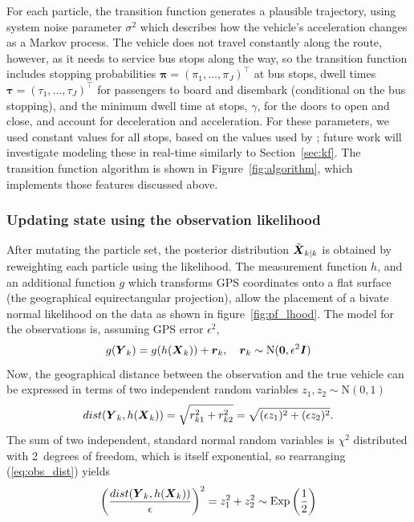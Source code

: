 For each particle, the transition function generates a plausible trajectory,
using system noise parameter $\sigma^2$ which describes 
how the vehicle's acceleration changes as a Markov process.
The vehicle does not travel constantly along the route,
however, as it needs to service bus stops along the way,
so the transition function includes 
stopping probabilities $\boldsymbol\pi = (\pi_1,\ldots,\pi_J)^\top$ at bus stops,
dwell times $\boldsymbol\tau = (\tau_1,\ldots,\tau_J)^\top$ for passengers to
board and disembark (conditional on the bus stopping),
and the minimum dwell time at stops, $\gamma$,
for the doors to open and close,
and account for deceleration and acceleration.
For these parameters, we used constant values for all stops,
based on the values used by \cite{Hans_2015};
future work will investigate modeling these in real-time similarly to Section~\ref{sec:kf}.
The transition function algorithm is shown in Figure~\ref{fig:algorithm},
which implements those features discussed above.



\subsubsection{Updating state using the observation likelihood}
\label{sec:pf_update}

After mutating the particle set, the posterior distribution $\tilde{\mbox{$\boldsymbol{X}$}}_{k|k}$ 
is obtained by reweighting each particle using the likelihood.
The measurement function $h$,
and an additional function $g$ which transforms GPS coordinates onto a flat
surface (the geographical equirectangular projection),
allow the placement of a bivate normal likelihood on the data
as shown in figure~\ref{fig:pf_lhood}.
The model for the observations is,
assuming GPS error $\epsilon^2$,
\begin{equation}
\label{eq:pf_obs_model}
g(\mbox{$\boldsymbol{Y}$}_k) = g(h(\mbox{$\boldsymbol{X}$}_k)) + \boldsymbol{r}_k,
\quad \boldsymbol{r}_k \sim \mathrm{N}(\boldsymbol{0}, \epsilon^2\boldsymbol{I})
\end{equation}
Now, the geographical distance between the observation and the true vehicle can be expressed
in terms of two independent random variables $z_1, z_2 \sim \mathrm{N}(0,1)$
\begin{equation}
\label{eq:obs_dist}
dist(\mbox{$\boldsymbol{Y}$}_k, h(\mbox{$\boldsymbol{X}$}_k)) = \sqrt{r_{k1}^2 + r_{k2}^2} 
    = \sqrt{(\epsilon z_1)^2 + (\epsilon z_2)^2}.
\end{equation}
The sum of two independent, standard normal random variables 
is $\chi^2$ distributed with 2~degrees of freedom,
which is itself exponential,
so rearranging (\ref{eq:obs_dist}) yields
\begin{equation}
\label{eq:obs_exp}
\left(\frac{dist(\mbox{$\boldsymbol{Y}$}_k, h(\mbox{$\boldsymbol{X}$}_k))}{\epsilon}\right)^2 =
z_1^2 + z_2^2 \sim \mathrm{Exp}\left(\frac{1}{2}\right)
\end{equation}

